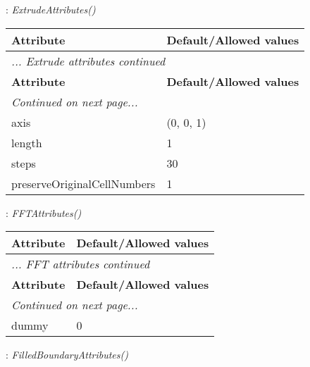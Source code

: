 \documentclass[10pt,a4paper]{report}
\begin{document}
\newpage

{}
: {\it ExtrudeAttributes() }\\[-3mm]

\begin{longtable}{ll}
{\bf Attribute} & {\bf Default/Allowed values} \\
\hline \hline
\endfirsthead
\multicolumn{2}{l}{{\it ... Extrude attributes continued}} \\
{\bf Attribute} & {\bf Default/Allowed values} \\
\hline \hline
\endhead
\hline
\multicolumn{2}{l}{{\it Continued on next page...}} \\
\endfoot
\hline
\endlastfoot

axis  &  (0, 0, 1) \\
length  &  1 \\
steps  &  30 \\
preserveOriginalCellNumbers  &  1 \\
\end{longtable}

\newpage

{}
: {\it FFTAttributes() }\\[-3mm]

\begin{longtable}{ll}
{\bf Attribute} & {\bf Default/Allowed values} \\
\hline \hline
\endfirsthead
\multicolumn{2}{l}{{\it ... FFT attributes continued}} \\
{\bf Attribute} & {\bf Default/Allowed values} \\
\hline \hline
\endhead
\hline
\multicolumn{2}{l}{{\it Continued on next page...}} \\
\endfoot
\hline
\endlastfoot

dummy  &  0 \\
\end{longtable}

\newpage

{}
: {\it FilledBoundaryAttributes() }\\[-3mm]
\end{document}
